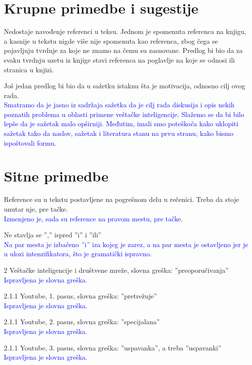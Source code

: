 \documentclass[a4paper]{report}
\newcommand{\odgovor}[1]{\textcolor{blue}{#1}}
\begin{document}
\section{Krupne primedbe i sugestije}
Nedostaje navođenje referenci u teksu. Jednom je spomenuta referenca na knjigu, a kasnije u tekstu nigde više nije spomenuta kao referenca, zbog čega se pojavljuju tvrdnje za koje ne znamo na čemu su zasnovane. Predlog bi bio da za svaku tvrdnju uzetu iz knjige stavi referenca na poglavlje na koje se odnosi ili stranica u knjizi.

Još jedan predlog bi bio da u sažetku istaknu šta je motivacija, odnosno cilj ovog rada. \\
\odgovor{Smatramo da je jasno iz sadržaja sažetka da je cilj rada diskusija i opis nekih poznatih problema u oblasti primene veštačke inteligencije. Slažemo se da bi bilo lepše da je sažetak malo opširniji. Međutim, imali smo poteškoća kako uklopiti sažetak tako da naslov, sažetak i literatura stanu na prvu stranu, kako bismo ispoštovali formu.}


\section{Sitne primedbe}
Reference su u tekstu postavljene na pogrešnom delu u rečenici. Treba da stoje unutar nje, pre tačke. \\
\odgovor{Izmenjeno je, sada su reference na pravom mestu, pre tačke.}

Ne stavlja se '','' ispred ''i'' i ''ili'' \\
\odgovor{Na par mesta je izbačeno ˝i˝ iza kojeg je zarez, a na par mesta je ostavljeno jer je u ulozi intenzifikatora, što je gramatički ispravno.}

2 Veštačke inteligencije i društvene mreže, slovna greška: ''preoporučivanja'' \\
\odgovor{Ispravljena je slovna greška.}

2.1.1 Youtube, 1. pasus, slovna greška: ''pretrežuje'' \\
\odgovor{Ispravljena je slovna greška.}


2.1.1 Youtube, 2. pasus, slovna greška: ''specijalana'' \\
\odgovor{Ispravljena je slovna greška.}


2.1.1 Youtube, 3. pasus, slovna greška: ''uspavanka'', a treba ''uspavanki'' \\
\odgovor{Ispravljena je slovna greška.}
\end{document}
